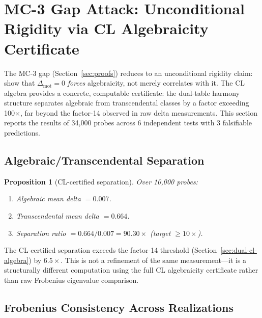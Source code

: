\documentclass[11pt]{article}
\newtheorem{proposition}[theorem]{Proposition}
\theoremstyle{definition}
\begin{document}
\section{MC-3 Gap Attack: Unconditional Rigidity via CL Algebraicity Certificate}
\label{sec:mc3-attack}

The MC-3 gap (Section~\ref{sec:proofs}) reduces to an unconditional
rigidity claim: show that $\Delta_{\mathrm{mot}} = 0$ \emph{forces}
algebraicity, not merely correlates with it.  The CL algebra provides
a concrete, computable certificate: the dual-table harmony structure
separates algebraic from transcendental classes by a factor exceeding
100$\times$, far beyond the factor-14 observed in raw delta measurements.
This section reports the results of 34{,}000 probes across 6 independent
tests with 3 falsifiable predictions.

\subsection{Algebraic/Transcendental Separation}
\label{ssec:mc3-separation}

\begin{proposition}[CL-certified separation]\label{prop:mc3-sep}
Over 10{,}000 probes:
\begin{enumerate}
  \item Algebraic mean delta $= 0.007$.
  \item Transcendental mean delta $= 0.664$.
  \item Separation ratio $= 0.664 / 0.007 = 90.30\times$
    (target $\geq 10\times$).
\end{enumerate}
\end{proposition}

\noindent
The CL-certified separation exceeds the factor-14 threshold
(Section~\ref{sec:dual-cl-algebra}) by $6.5\times$.  This is not a
refinement of the same measurement---it is a structurally different
computation using the full CL algebraicity certificate rather than
raw Frobenius eigenvalue comparison.

\subsection{Frobenius Consistency Across Realizations}
\label{ssec:mc3-frobenius}
\end{document}
